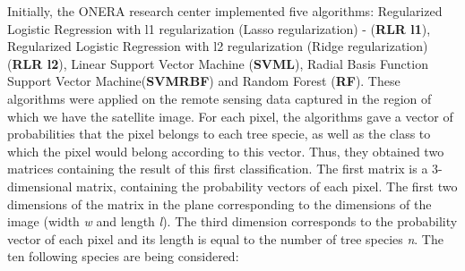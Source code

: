 \documentclass{siamart171218}
\begin{document}
Initially, the ONERA research center implemented five algorithms: Regularized Logistic Regression with l1 regularization (Lasso regularization) - (\textbf{RLR l1}), Regularized Logistic Regression with l2 regularization (Ridge regularization) (\textbf{RLR l2}), Linear Support Vector Machine (\textbf{SVML}), Radial Basis Function Support Vector Machine(\textbf{SVMRBF}) and Random Forest (\textbf{RF}). These algorithms were applied on the remote sensing data captured in the region of which we have the satellite image. For each pixel, the algorithms gave a vector of probabilities that the pixel belongs to each tree specie, as well as the class to which the pixel would belong according to this vector. Thus, they obtained two matrices containing the result of this first classification.
The first matrix is a 3-dimensional matrix, containing the probability vectors of each pixel. The first two dimensions of the matrix in the plane corresponding to the dimensions of the image (width \textit{w} and length  \textit{l}). The third dimension corresponds to the probability vector of each pixel and its length is equal to the number of tree species \textit{n}. The ten following species are being considered:  \\[0.1cm] 
\end{document}
